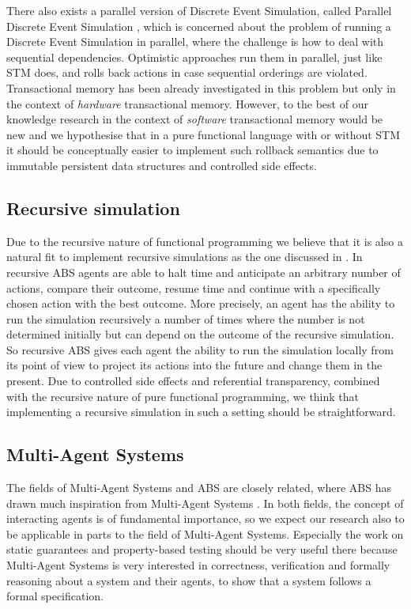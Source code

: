 There also exists a parallel version of Discrete Event Simulation, called Parallel Discrete Event Simulation \cite{fujimoto_parallel_2017}, which is concerned about the problem of running a Discrete Event Simulation in parallel, where the challenge is how to deal with sequential dependencies. Optimistic approaches run them in parallel, just like STM does, and rolls back actions in case sequential orderings are violated. Transactional memory has been already investigated in this problem \cite{hay_experiments_2015} but only in the context of \textit{hardware} transactional memory. However, to the best of our knowledge research in the context of \textit{software} transactional memory would be new and we hypothesise that in a pure functional language with or without STM it should be conceptually easier to implement such rollback semantics due to immutable persistent data structures and controlled side effects.
 
\subsection{Recursive simulation}
Due to the recursive nature of functional programming we believe that it is also a natural fit to implement recursive simulations as the one discussed in \cite{gilmer_recursive_2000}. In recursive ABS agents are able to halt time and anticipate an arbitrary number of actions, compare their outcome, resume time and continue with a specifically chosen action with the best outcome. More precisely, an agent has the ability to run the simulation recursively a number of times where the number is not determined initially but can depend on the outcome of the recursive simulation. So recursive ABS gives each agent the ability to run the simulation locally from its point of view to project its actions into the future and change them in the present. Due to controlled side effects and referential transparency, combined with the recursive nature of pure functional programming, we think that implementing a recursive simulation in such a setting should be straightforward.

\subsection{Multi-Agent Systems}
The fields of Multi-Agent Systems and ABS are closely related, where ABS has drawn much inspiration from Multi-Agent Systems \cite{weiss_multiagent_2013,wooldridge_introduction_2009}. In both fields, the concept of interacting agents is of fundamental importance, so we expect our research also to be applicable in parts to the field of Multi-Agent Systems. Especially the work on static guarantees and property-based testing should be very useful there because Multi-Agent Systems is very interested in correctness, verification and formally reasoning about a system and their agents, to show that a system follows a formal specification.